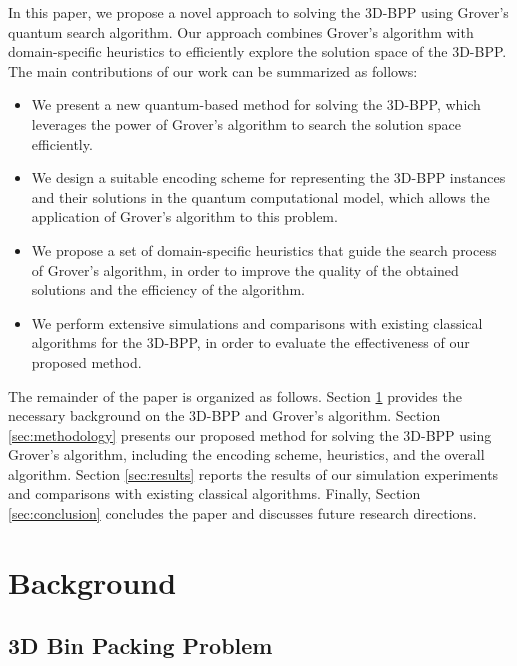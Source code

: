 In this paper, we propose a novel approach to solving the 3D-BPP using Grover's quantum search algorithm. Our approach combines Grover's algorithm with domain-specific heuristics to efficiently explore the solution space of the 3D-BPP. The main contributions of our work can be summarized as follows:

\begin{itemize}
    \item We present a new quantum-based method for solving the 3D-BPP, which leverages the power of Grover's algorithm to search the solution space efficiently.
    
    \item We design a suitable encoding scheme for representing the 3D-BPP instances and their solutions in the quantum computational model, which allows the application of Grover's algorithm to this problem.
    
    \item We propose a set of domain-specific heuristics that guide the search process of Grover's algorithm, in order to improve the quality of the obtained solutions and the efficiency of the algorithm.
    
    \item We perform extensive simulations and comparisons with existing classical algorithms for the 3D-BPP, in order to evaluate the effectiveness of our proposed method.
\end{itemize}

The remainder of the paper is organized as follows. Section \ref{sec:background} provides the necessary background on the 3D-BPP and Grover's algorithm. Section \ref{sec:methodology} presents our proposed method for solving the 3D-BPP using Grover's algorithm, including the encoding scheme, heuristics, and the overall algorithm. Section \ref{sec:results} reports the results of our simulation experiments and comparisons with existing classical algorithms. Finally, Section \ref{sec:conclusion} concludes the paper and discusses future research directions.

\section{Background} \label{sec:background}

\subsection{3D Bin Packing Problem}

